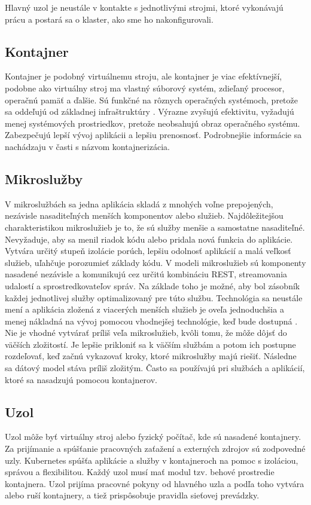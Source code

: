 Hlavný uzol je neustále v kontakte s jednotlivými strojmi, ktoré vykonávajú prácu a postará sa o klaster, ako sme ho nakonfigurovali.

\subsection*{Kontajner}
Kontajner je podobný virtuálnemu stroju, ale kontajner je viac efektívnejší, podobne ako virtuálny stroj ma vlastný súborový systém, zdieľaný procesor, operačnú pamäť a ďalšie. Sú funkčné na rôznych operačných systémoch, pretože sa oddeľujú od základnej infraštruktúry \cite{kubernetes}.
Výrazne zvyšujú efektivitu, vyžadujú menej systémových prostriedkov, pretože neobsahujú obraz operačného systému. Zabezpečujú lepší vývoj aplikácii a lepšiu prenosnosť. Podrobnejšie informácie sa nachádzaju v časti s názvom kontajnerizácia.

\subsection*{Mikroslužby}
V mikroslužbách sa jedna aplikácia skladá z mnohých voľne prepojených, nezávisle nasaditeľných menších komponentov alebo služieb. Najdôležitejšou charakteristikou mikroslužieb je to, že sú služby menšie a samostatne nasaditeľné. Nevyžaduje, aby sa menil riadok kódu alebo pridala nová funkcia do aplikácie. Vytvára určitý stupeň izolácie porúch, lepšiu odolnosť aplikácií a malá veľkosť služieb, uľahčuje porozumieť základy kódu. V modeli mikroslužieb sú komponenty nasadené nezávisle a komunikujú cez určitú kombináciu REST, streamovania udalostí a sprostredkovateľov správ. Na základe toho je možné, aby bol zásobník každej jednotlivej služby optimalizovaný pre túto službu. Technológia sa neustále mení a aplikácia zložená z viacerých menších služieb je oveľa jednoduchšia a menej nákladná na vývoj pomocou vhodnejšej technológie, keď bude dostupná \cite{microibm}. Nie je vhodné vytvárať príliš veľa mikroslužieb, kvôli tomu, že môže dôjsť do väčších zložitostí. Je lepšie prikloniť sa k väčším službám a potom ich postupne rozdeľovať, keď začnú vykazovať kroky, ktoré mikroslužby majú riešiť. Následne sa dátový model stáva príliš zložitým. Často sa používajú pri službách a aplikácií, ktoré sa nasadzujú pomocou kontajnerov.

\subsection*{Uzol}
Uzol môže byť virtuálny stroj alebo fyzický počítač, kde sú nasadené kontajnery. Za prijímanie a spúšťanie pracovných zaťažení a externých zdrojov sú zodpovedné uzly. Kubernetes spúšťa aplikácie a služby v kontajneroch na pomoc s izoláciou, správou a flexibilitou. Každý uzol musí mať modul tzv. behové prostredie kontajnera. Uzol prijíma pracovné pokyny od hlavného uzla a podľa toho vytvára alebo ruší kontajnery, a tiež prispôsobuje pravidla sieťovej prevádzky.

